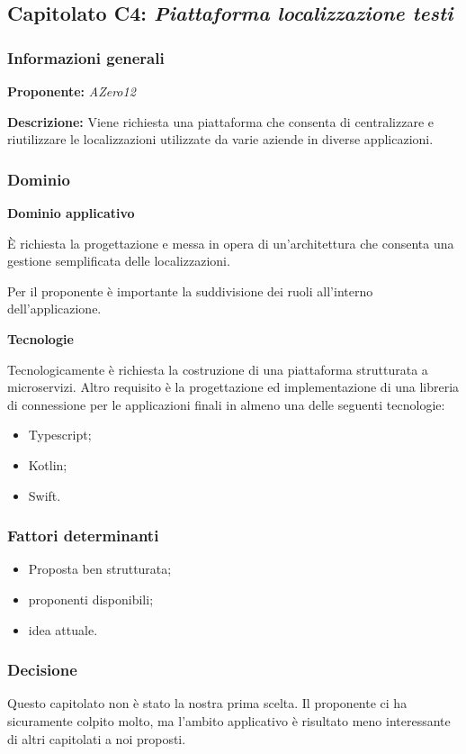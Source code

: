 \subsection{Capitolato C4: \textit{Piattaforma localizzazione testi}}

\subsubsection{Informazioni generali}

\textbf{Proponente:} \textit{AZero12}

\textbf{Descrizione:} Viene richiesta una piattaforma che consenta di centralizzare e riutilizzare le localizzazioni utilizzate da varie aziende in diverse applicazioni. 
\subsubsection{Dominio}

\textbf{Dominio applicativo}

È richiesta la progettazione e messa in opera di un'architettura che consenta una gestione semplificata delle localizzazioni.

Per il proponente è importante la suddivisione dei ruoli all'interno dell'applicazione.

\textbf{Tecnologie}

Tecnologicamente è richiesta la costruzione di una piattaforma strutturata a microservizi. Altro requisito è la progettazione ed implementazione di una libreria di connessione per le applicazioni finali in almeno una delle seguenti tecnologie:
\begin{itemize}
    \item Typescript;
    \item Kotlin;
    \item Swift.
\end{itemize}

\subsubsection{Fattori determinanti}
\begin{itemize}
    \item Proposta ben strutturata;
    \item proponenti disponibili;
    \item idea attuale.
\end{itemize}

\subsubsection{Decisione}
Questo capitolato non è stato la nostra prima scelta. Il proponente ci ha sicuramente colpito molto, ma l'ambito applicativo è risultato meno interessante di altri capitolati a noi proposti.
